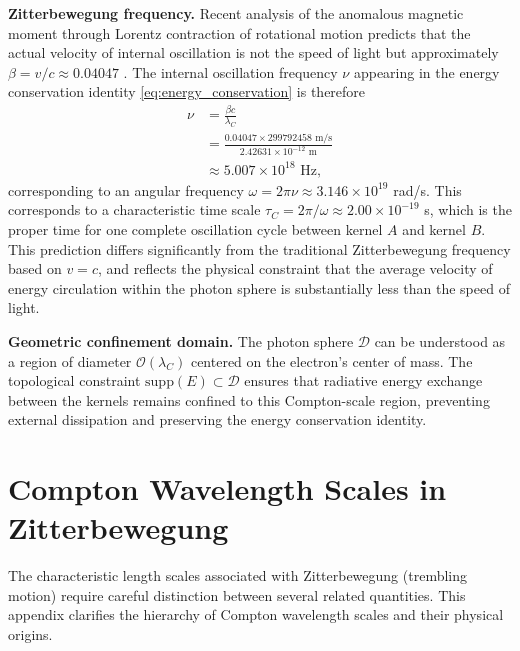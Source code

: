 \documentclass[%
 reprint,
 amsmath,amssymb,
 aps,
 prb,
]{revtex4-2}
\numberwithin{equation}{section}
\begin{document}
\medskip
\noindent\textbf{Zitterbewegung frequency.}
Recent analysis of the anomalous magnetic moment through Lorentz contraction of rotational motion predicts that the actual velocity of internal oscillation is not the speed of light but approximately $\beta = v/c \approx 0.04047$ \cite{hanamura17764997}.
The internal oscillation frequency $\nu$ appearing in the energy conservation identity \eqref{eq:energy_conservation} is therefore
\begin{equation}
\begin{split}
\nu &= \frac{\beta c}{\lambda_C} \\
    &= \frac{0.04047 \times 299792458 \text{ m/s}}{2.42631 \times 10^{-12} \text{ m}} \\
    &\approx 5.007 \times 10^{18} \text{ Hz},
\end{split}
\end{equation}
corresponding to an angular frequency $\omega = 2\pi\nu \approx 3.146 \times 10^{19}$ rad/s.
This corresponds to a characteristic time scale $\tau_C = 2\pi/\omega \approx 2.00 \times 10^{-19}$ s, which is the proper time for one complete oscillation cycle between kernel $A$ and kernel $B$.
This prediction differs significantly from the traditional Zitterbewegung frequency based on $v = c$, and reflects the physical constraint that the average velocity of energy circulation within the photon sphere is substantially less than the speed of light.

\medskip
\noindent\textbf{Geometric confinement domain.}
The photon sphere $\mathcal{D}$ can be understood as a region of diameter $\mathcal{O}(\lambda_C)$ centered on the electron's center of mass. The topological constraint $\mathrm{supp}(E) \subset \mathcal{D}$ ensures that radiative energy exchange between the kernels remains confined to this Compton-scale region, preventing external dissipation and preserving the energy conservation identity.


\section{Compton Wavelength Scales in Zitterbewegung}
\label{sec:appendix_zb_scales}

The characteristic length scales associated with Zitterbewegung (trembling motion) require careful distinction between several related quantities. This appendix clarifies the hierarchy of Compton wavelength scales and their physical origins.
\end{document}
